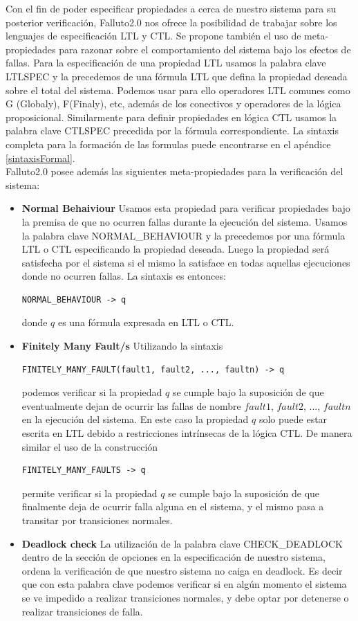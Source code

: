 \documentclass[titlepage, 12pt]{book}
\begin{document}
Con el fin de poder especificar propiedades a cerca de nuestro sistema para su posterior verificaci\'on, Falluto2.0 nos ofrece la posibilidad de trabajar sobre los lenguajes de especificaci\'on LTL y CTL. Se propone tambi\'en el uso de meta-propiedades para razonar sobre el comportamiento del sistema bajo los efectos de fallas.
Para la especificaci\'on de una propiedad LTL usamos la palabra clave LTLSPEC y la precedemos de una f\'ormula LTL que defina la propiedad deseada sobre el total del sistema. Podemos usar para ello operadores LTL comunes como G (Globaly), F(Finaly), etc, adem\'as de los conectivos y operadores de la l\'ogica proposicional. Similarmente para definir propiedades en l\'ogica CTL usamos la palabra clave CTLSPEC precedida por la f\'ormula correspondiente. La sintaxis completa para la formaci\'on de las formulas puede encontrarse en el ap\'endice \ref{sintaxisFormal}.\\
Falluto2.0 posee adem\'as las siguientes meta-propiedades para la verificaci\'on del sistema:
\begin{itemize}
\item \textbf{Normal Behaiviour} Usamos esta propiedad para verificar propiedades bajo la premisa de que no ocurren fallas durante la ejecuci\'on del sistema. Usamos la palabra clave NORMAL\_BEHAVIOUR y la precedemos por una f\'ormula LTL o CTL especificando la propiedad deseada. Luego la propiedad ser\'a satisfecha por el sistema si el mismo la satisface en todas aquellas ejecuciones donde no ocurren fallas. La sintaxis es entonces: \begin{verbatim}NORMAL_BEHAVIOUR -> q \end{verbatim} donde $q$ es una f\'ormula expresada en LTL o CTL.
\item \textbf{Finitely Many Fault/s} Utilizando la sintaxis \begin{verbatim}FINITELY_MANY_FAULT(fault1, fault2, ..., faultn) -> q\end{verbatim} podemos verificar si la propiedad $q$ se cumple bajo la suposici\'on de que eventualmente dejan de ocurrir las fallas de nombre $fault1$, $fault2$, ..., $faultn$ en la ejecuci\'on del sistema. En este caso la propiedad $q$ solo puede estar escrita en LTL debido a restricciones intr\'insecas de la l\'ogica CTL. De manera similar el uso de la construcci\'on \begin{verbatim}FINITELY_MANY_FAULTS -> q \end{verbatim} permite verificar si la propiedad $q$ se cumple bajo la suposici\'on de que finalmente deja de ocurrir falla alguna en el sistema, y el mismo pasa a transitar por transiciones normales.
\item \textbf{Deadlock check} La utilizaci\'on de la palabra clave CHECK\_DEADLOCK dentro de la secci\'on de opciones en la especificaci\'on de nuestro sistema, ordena la verificaci\'on de que nuestro sistema no caiga en deadlock. Es decir que con esta palabra clave podemos verificar si en alg\'un momento el sistema se ve impedido a realizar transiciones normales, y debe optar por detenerse o realizar transiciones de falla.
\end{itemize}
\end{document}
